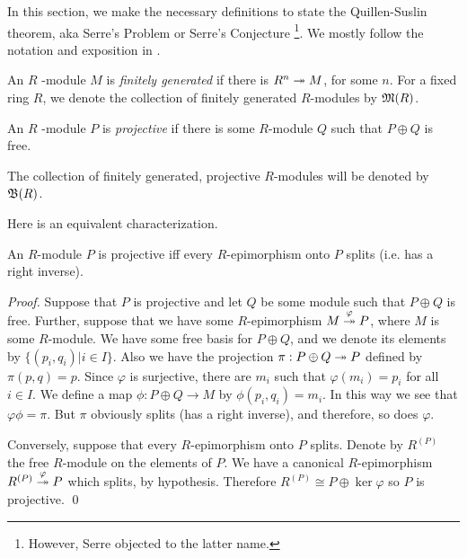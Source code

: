 In this section, we make the necessary definitions to state the Quillen-Suslin theorem, aka Serre's Problem or Serre's Conjecture \footnote{However, Serre objected to the latter name.}.
We mostly follow the notation and exposition in \citep{lam06}.

\begin{definition}
\label{def:fingen_rmodule}
  An $R$ -module $M$ is \emph{finitely generated} if there is $R^n \twoheadrightarrow M$, for some $n$.
  For a fixed ring $R$, we denote the collection of finitely generated $R$-modules by $\mathfrak M(R)$.
\end{definition}

\begin{definition}
\label{def:proj_rmodule}
  An $R$ -module $P$ is \emph{projective} if there is some $R$-module $Q$ such that
  $P \oplus Q$ is free.
\end{definition}

\begin{definition}
\label{def:fingen_rmodule}
  The collection of finitely generated, projective $R$-modules will be denoted by $\mathfrak B(R)$.
\end{definition}

Here is an equivalent characterization.

\begin{proposition}
\label{prop:projchar}
  An $R$-module $P$ is projective iff every $R$-epimorphism onto $P$ splits (i.e. has a right inverse).
\end{proposition}
\begin{proof}
  Suppose that $P$ is projective and let $Q$ be some module such that $P \oplus Q$ is free.
  Further, suppose that we have some $R$-epimorphism $M \overset \varphi {\twoheadrightarrow} P$, where $M$ is some $R$-module.
  We have some free basis for $P\oplus Q$, and we denote its elements by $\{(p_i, q_i) | i \in I\}$.
  Also we have the projection $\pi: P \oplus Q \twoheadrightarrow P$ defined by $\pi(p,q) = p$.
  Since $\varphi$ is surjective, there are $m_i$ such that $\varphi(m_i) = p_i$ for all $i \in I$.
  We define a map $\phi: P \oplus Q \rightarrow M$ by $\phi(p_i, q_i) = m_i$.
  In this way we see that $\varphi \phi = \pi$.
  But $\pi$ obviously splits (has a right inverse), and therefore, so does $\varphi$.

  Conversely, suppose that every $R$-epimorphism onto $P$ splits.
  Denote by $R^{(P)}$ the free $R$-module on the elements of $P$.
  We have a canonical $R$-epimorphism $R^{(P)} \overset{\varphi}{\twoheadrightarrow} P$ which splits, by hypothesis.
  Therefore $R^{(P)} \cong P \oplus \ker \varphi$ so $P$ is projective.
  \qed
\end{proof}

